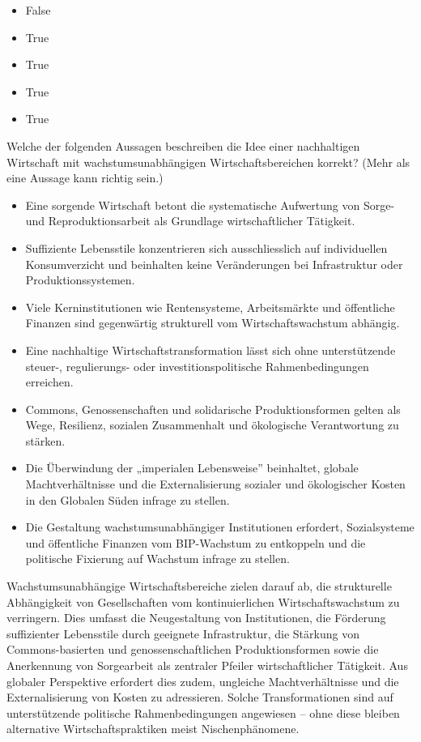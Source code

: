 \documentclass[
  nswissgerman,
  a4paper,
  DIV=11,
  numbers=noendperiod,
  oneside,
  openany]{scrreprt}
\providecommand{\tightlist}{%
  \setlength{\itemsep}{0pt}\setlength{\parskip}{0pt}}
\begin{document}
\begin{itemize}
\tightlist
\item
  False
\item
  True
\item
  True
\item
  True
\item
  True
\end{itemize}

Welche der folgenden Aussagen beschreiben die Idee einer nachhaltigen
Wirtschaft mit wachstumsunabhängigen Wirtschaftsbereichen korrekt? (Mehr
als eine Aussage kann richtig sein.)

\begin{itemize}
\tightlist
\item[$\square$]
  Eine sorgende Wirtschaft betont die systematische Aufwertung von
  Sorge- und Reproduktionsarbeit als Grundlage wirtschaftlicher
  Tätigkeit.
\item[$\square$]
  Suffiziente Lebensstile konzentrieren sich ausschliesslich auf
  individuellen Konsumverzicht und beinhalten keine Veränderungen bei
  Infrastruktur oder Produktionssystemen.
\item[$\square$]
  Viele Kerninstitutionen wie Rentensysteme, Arbeitsmärkte und
  öffentliche Finanzen sind gegenwärtig strukturell vom
  Wirtschaftswachstum abhängig.
\item[$\square$]
  Eine nachhaltige Wirtschaftstransformation lässt sich ohne
  unterstützende steuer-, regulierungs- oder investitionspolitische
  Rahmenbedingungen erreichen.
\item[$\square$]
  Commons, Genossenschaften und solidarische Produktionsformen gelten
  als Wege, Resilienz, sozialen Zusammenhalt und ökologische
  Verantwortung zu stärken.
\item[$\square$]
  Die Überwindung der „imperialen Lebensweise'' beinhaltet, globale
  Machtverhältnisse und die Externalisierung sozialer und ökologischer
  Kosten in den Globalen Süden infrage zu stellen.
\item[$\square$]
  Die Gestaltung wachstumsunabhängiger Institutionen erfordert,
  Sozialsysteme und öffentliche Finanzen vom BIP-Wachstum zu entkoppeln
  und die politische Fixierung auf Wachstum infrage zu stellen.
\end{itemize}

Wachstumsunabhängige Wirtschaftsbereiche zielen darauf ab, die
strukturelle Abhängigkeit von Gesellschaften vom kontinuierlichen
Wirtschaftswachstum zu verringern. Dies umfasst die Neugestaltung von
Institutionen, die Förderung suffizienter Lebensstile durch geeignete
Infrastruktur, die Stärkung von Commons-basierten und
genossenschaftlichen Produktionsformen sowie die Anerkennung von
Sorgearbeit als zentraler Pfeiler wirtschaftlicher Tätigkeit. Aus
globaler Perspektive erfordert dies zudem, ungleiche Machtverhältnisse
und die Externalisierung von Kosten zu adressieren. Solche
Transformationen sind auf unterstützende politische Rahmenbedingungen
angewiesen -- ohne diese bleiben alternative Wirtschaftspraktiken meist
Nischenphänomene.
\end{document}
